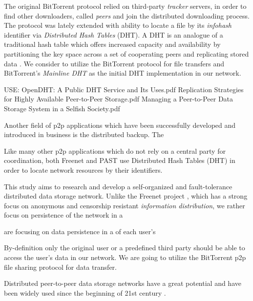 The original BitTorrent protocol relied on third-party \emph{tracker}
servers, in order to find other downloaders, called \emph{peers} and
join the distributed downloading process.
The protocol was lately extended with ability to locate a file by
its \emph{infohash} identifier via \emph{Distributed Hash Tables} (DHT).
A DHT is an analogue of a traditional hash table which offers increased
capacity and availability by partitioning the key space across a set
of cooperating peers and replicating stored data \cite{opendht}.
We consider to utilize the BitTorrent protocol for file transfers
and BitTorrent's \emph{Mainline DHT} \citep{bittorrent-dht} as the
initial DHT implementation in our network.


USE:
OpenDHT: A Public DHT Service and Its Uses.pdf
Replication Strategies for Highly Available Peer-to-Peer Storage.pdf
Managing a Peer-to-Peer Data Storage System in a Selfish Society.pdf


Another field of p2p applications which have been successfully developed
and introduced in business is the distributed backup. The

Like many other p2p applications which do not rely on a central party
for coordination, both Freenet and PAST use Distributed Hash Tables (DHT)
in order to locate network resources by their identifiers.

This study aims to research and develop a self-organized and fault-tolerance
distributed data storage network. Unlike the Freenet project \cite{freenet},
which has a strong focus on anonymous and censorship resistant \emph{information
distribution}, we rather focus on persistence of the network in a

  are focusing on data persistence in a  of each user's

By-definition only the original user
or a predefined third party should be able to access the user's data
in our network. We are going to utilize the BitTorrent \cite{bittorrent-ma}
p2p file sharing protocol for data transfer.


Distributed peer-to-peer data storage networks have a great potential and have
been widely used since the beginning of 21st century
\cite{chord-01}.
